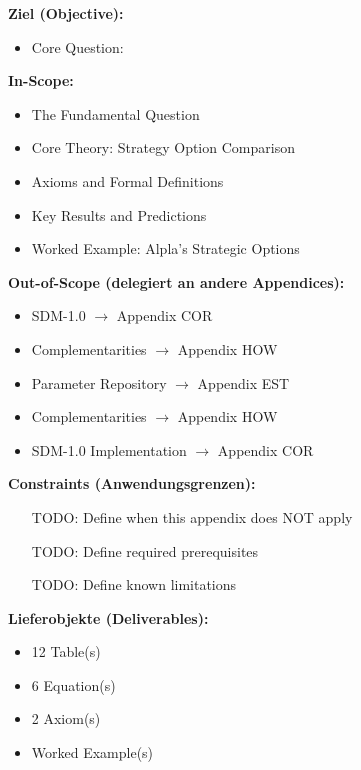 \begin{tcolorbox}[
    colback=orange!5!white,
    colframe=orange!75!black,
    title={\textbf{Appendix Scope: Ziel / In-Scope / Out-of-Scope / Constraints}},
    fonttitle=\bfseries
]

\textbf{Ziel (Objective):}
\begin{itemize}[nosep]
    \item Core Question:
\end{itemize}

\textbf{In-Scope:}
\begin{itemize}[nosep]
    \item The Fundamental Question
    \item Core Theory: Strategy Option Comparison
    \item Axioms and Formal Definitions
    \item Key Results and Predictions
    \item Worked Example: Alpla's Strategic Options
\end{itemize}

\textbf{Out-of-Scope (delegiert an andere Appendices):}
\begin{itemize}[nosep]
    \item SDM-1.0 $\rightarrow$ Appendix COR
    \item Complementarities $\rightarrow$ Appendix HOW
    \item Parameter Repository $\rightarrow$ Appendix EST
    \item Complementarities $\rightarrow$ Appendix HOW
    \item SDM-1.0 Implementation $\rightarrow$ Appendix COR
\end{itemize}

\textbf{Constraints (Anwendungsgrenzen):}
\begin{itemize}[nosep]
    \item [TODO: Define when this appendix does NOT apply]
    \item [TODO: Define required prerequisites]
    \item [TODO: Define known limitations]
\end{itemize}

\textbf{Lieferobjekte (Deliverables):}
\begin{itemize}[nosep]
    \item 12 Table(s)
    \item 6 Equation(s)
    \item 2 Axiom(s)
    \item Worked Example(s)
\end{itemize}

\end{tcolorbox}



